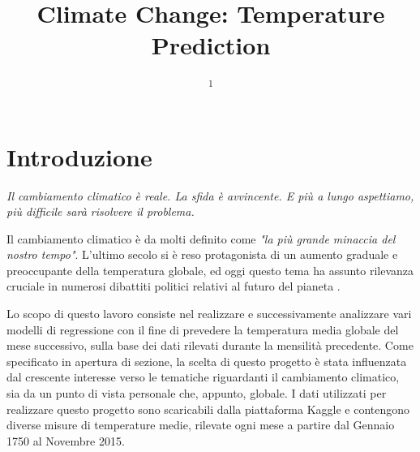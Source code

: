 \documentclass[12pt, a4paper, twocolumn]{article} %
\title{Climate Change: Temperature Prediction} %
\author{
	\authorstyle{Davide Abete\textsuperscript{1}, Fabrizio Cominetti\textsuperscript{1} e Agazzi Ruben\textsuperscript{1}} %
	\newline\newline
		\textsuperscript{1}\institution{Universita‘ degli Studi di Milano Bicocca, CdLM Data Science}\\ %
}
\begin{document}

\maketitle %

\thispagestyle{firstpage} %

\tableofcontents
\bigskip
\bigskip
\bigskip
\bigskip
\bigskip
{}


\section{Introduzione}
\textit{Il cambiamento climatico è reale. La sfida è avvincente. E più a lungo aspettiamo, più difficile sarà risolvere il problema.} \cite{climatequote}
\bigskip

Il cambiamento climatico è da molti definito come \textit{"la più grande minaccia del nostro tempo"}. L'ultimo secolo si è reso protagonista di un aumento graduale e preoccupante della temperatura globale, ed oggi questo tema ha assunto rilevanza cruciale in numerosi dibattiti politici relativi al futuro del pianeta \cite{climatepaper}. %

Lo scopo di questo lavoro consiste nel realizzare e successivamente analizzare vari modelli di regressione con il fine di prevedere la temperatura media globale del mese successivo, sulla base dei dati rilevati durante la mensilità precedente.
Come specificato in apertura di sezione, la scelta di questo progetto è stata influenzata dal crescente interesse verso le tematiche riguardanti il cambiamento climatico, sia da un punto di vista personale che, appunto, globale.
I dati utilizzati per realizzare questo progetto sono scaricabili dalla piattaforma Kaggle \cite{dataset} e contengono diverse misure di temperature medie, rilevate ogni mese a partire dal Gennaio 1750 al Novembre 2015.
\end{document}
